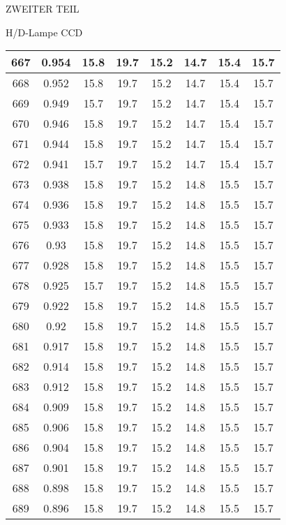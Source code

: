\begin{appendix}
\begin{chapter}{ZWEITER TEIL}
\begin{section}{H/D-Lampe CCD}
\begin{scriptsize}
\begin{longtable}[htbp]{|c|c|c|c|c|c|c|c|}
            667 & 0.954 & 15.8 & 19.7 & 15.2 & 14.7 & 15.4 & 15.7 \\ \hline
            668 & 0.952 & 15.8 & 19.7 & 15.2 & 14.7 & 15.4 & 15.7 \\ \hline
            669 & 0.949 & 15.7 & 19.7 & 15.2 & 14.7 & 15.4 & 15.7 \\ \hline
            670 & 0.946 & 15.8 & 19.7 & 15.2 & 14.7 & 15.4 & 15.7 \\ \hline
            671 & 0.944 & 15.8 & 19.7 & 15.2 & 14.7 & 15.4 & 15.7 \\ \hline
            672 & 0.941 & 15.7 & 19.7 & 15.2 & 14.7 & 15.4 & 15.7 \\ \hline
            673 & 0.938 & 15.8 & 19.7 & 15.2 & 14.8 & 15.5 & 15.7 \\ \hline
            674 & 0.936 & 15.8 & 19.7 & 15.2 & 14.8 & 15.5 & 15.7 \\ \hline
            675 & 0.933 & 15.8 & 19.7 & 15.2 & 14.8 & 15.5 & 15.7 \\ \hline
            676 & 0.93 & 15.8 & 19.7 & 15.2 & 14.8 & 15.5 & 15.7 \\ \hline
            677 & 0.928 & 15.8 & 19.7 & 15.2 & 14.8 & 15.5 & 15.7 \\ \hline
            678 & 0.925 & 15.7 & 19.7 & 15.2 & 14.8 & 15.5 & 15.7 \\ \hline
            679 & 0.922 & 15.8 & 19.7 & 15.2 & 14.8 & 15.5 & 15.7 \\ \hline
            680 & 0.92 & 15.8 & 19.7 & 15.2 & 14.8 & 15.5 & 15.7 \\ \hline
            681 & 0.917 & 15.8 & 19.7 & 15.2 & 14.8 & 15.5 & 15.7 \\ \hline
            682 & 0.914 & 15.8 & 19.7 & 15.2 & 14.8 & 15.5 & 15.7 \\ \hline
            683 & 0.912 & 15.8 & 19.7 & 15.2 & 14.8 & 15.5 & 15.7 \\ \hline
            684 & 0.909 & 15.8 & 19.7 & 15.2 & 14.8 & 15.5 & 15.7 \\ \hline
            685 & 0.906 & 15.8 & 19.7 & 15.2 & 14.8 & 15.5 & 15.7 \\ \hline
            686 & 0.904 & 15.8 & 19.7 & 15.2 & 14.8 & 15.5 & 15.7 \\ \hline
            687 & 0.901 & 15.8 & 19.7 & 15.2 & 14.8 & 15.5 & 15.7 \\ \hline
            688 & 0.898 & 15.8 & 19.7 & 15.2 & 14.8 & 15.5 & 15.7 \\ \hline
            689 & 0.896 & 15.8 & 19.7 & 15.2 & 14.8 & 15.5 & 15.7 \\ \hline

\end{longtable}
\end{scriptsize}
\end{section}
\end{chapter}
\end{appendix}
